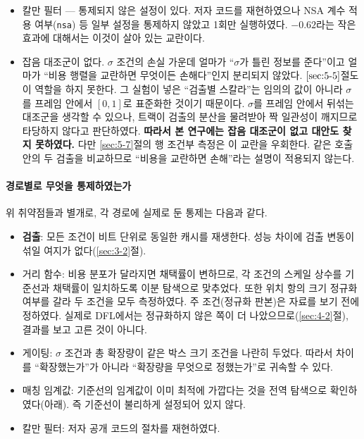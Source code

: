 \documentclass[12pt,a4paper,oneside]{report}
\begin{document}
\begin{itemize}[leftmargin=2em]
\item 칼만 필터 --- 통제되지 않은 설정이 있다. 저자 코드를 재현하였으나 NSA 계수 적용 여부(\texttt{nsa}) 등 일부 설정을 통제하지 않았고 1회만 실행하였다. $-0.62$라는 작은 효과에 대해서는 이것이 살아 있는 교란이다.
\item 잡음 대조군이 없다. $\sigma$ 조건의 손실 가운데 얼마가 ``$\sigma$가 틀린 정보를 준다''이고 얼마가 ``비용 행렬을 교란하면 무엇이든 손해다''인지 분리되지 않았다. $\ref{sec:5-5}$절도 이 역할을 하지 못한다. 그 실험이 넣은 ``검출별 스칼라''는 임의의 값이 아니라 $\sigma$를 프레임 안에서 $[0,1]$로 표준화한 것이기 때문이다. $\sigma$를 프레임 안에서 뒤섞는 대조군을 생각할 수 있으나, 트랙이 검출의 분산을 물려받아 짝 일관성이 깨지므로 타당하지 않다고 판단하였다. \textbf{따라서 본 연구에는 잡음 대조군이 없고 대안도 찾지 못하였다.} 다만 \ref{sec:5-7}절의 행 조건부 측정은 이 교란을 우회한다. 같은 호출 안의 두 검출을 비교하므로 ``비용을 교란하면 손해''라는 설명이 적용되지 않는다.
\end{itemize}

\paragraph{경로별로 무엇을 통제하였는가} 위 취약점들과 별개로, 각 경로에 실제로 둔 통제는 다음과 같다.

\begin{itemize}[leftmargin=2em]
\item \textbf{검출}: 모든 조건이 비트 단위로 동일한 캐시를 재생한다. 성능 차이에 검출 변동이 섞일 여지가 없다(\ref{sec:3-2}절).
\item 거리 함수: 비용 분포가 달라지면 채택률이 변하므로, 각 조건의 스케일 상수를 기준선과 채택률이 일치하도록 이분 탐색으로 맞추었다. 또한 위치 항의 크기 정규화 여부를 갈라 두 조건을 모두 측정하였다. 주 조건(정규화 판본)은 자료를 보기 전에 정하였다. 실제로 DFL에서는 정규화하지 않은 쪽이 더 나았으므로(\ref{sec:4-2}절), 결과를 보고 고른 것이 아니다.
\item 게이팅: $\sigma$ 조건과 총 확장량이 같은 박스 크기 조건을 나란히 두었다. 따라서 차이를 ``확장했는가''가 아니라 ``확장량을 무엇으로 정했는가''로 귀속할 수 있다.
\item 매칭 임계값: 기준선의 임계값이 이미 최적에 가깝다는 것을 전역 탐색으로 확인하였다(아래). 즉 기준선이 불리하게 설정되어 있지 않다.
\item 칼만 필터: 저자 공개 코드의 절차를 재현하였다.
\end{itemize}
\end{document}
